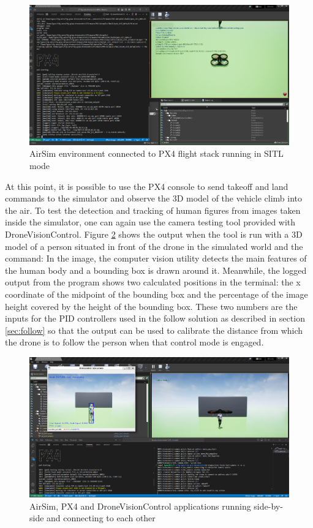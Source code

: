 \begin{figure}
  \centering
  \includegraphics[width=\textwidth, keepaspectratio]{img/airsim-sitl.png}
  \caption{AirSim environment connected to PX4 flight stack running in SITL mode}
  \label{fig:airsim-sitl}
\end{figure}

At this point, it is possible to use the PX4 console to send takeoff and land commands to the simulator and observe the 3D model of the vehicle climb into the air.
To test the detection and tracking of human figures from images taken inside the simulator, one can again use the camera testing tool provided with DroneVisionControl.
Figure \ref{fig:airsim-sitl-pose} shows the output when the tool is run with a 3D model of a person situated in front of the drone in the simulated world and the command:
In the image, the computer vision utility detects the main features of the human body and a bounding box is drawn around it.
Meanwhile, the logged output from the program shows two calculated positions in the terminal: the x coordinate of the midpoint of the bounding box and the percentage of the image height covered by the height of the bounding box.
These two numbers are the inputs for the PID controllers used in the follow solution as described in section \ref{sec:follow} so that the output can be used to calibrate the distance from which the drone is to follow the person when that control mode is engaged.

\begin{figure}
  \centering
  \includegraphics[width=\textwidth, keepaspectratio]{img/airsim-sitl-pose.png}
  \caption{AirSim, PX4 and DroneVisionControl applications running side-by-side and connecting to each other}
  \label{fig:airsim-sitl-pose}
\end{figure}

